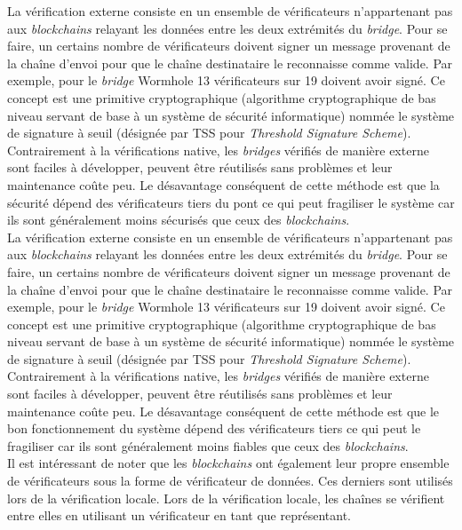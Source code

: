 La vérification externe consiste en un ensemble de \gls{vérificateur}s n’appartenant pas aux \textit{\gls{blockchain}s} relayant les données entre les deux extrémités du \textit{bridge}. Pour se faire, un certains nombre de \gls{vérificateur}s doivent signer un message provenant de la chaîne d’envoi pour que le chaîne destinataire le reconnaisse comme valide. Par exemple, pour le \textit{bridge} \gls{Wormhole} 13 \gls{vérificateur}s sur 19 doivent avoir signé\cite{NomadDocsExternal}. Ce concept est une primitive cryptographique (algorithme cryptographique de bas niveau servant de base à un système de sécurité informatique) nommée le système de signature à seuil (désignée par TSS pour \textit{Threshold Signature Scheme})\cite{BinanceTSS}. 
Contrairement à la vérifications native, les \textit{bridges} vérifiés de manière externe sont faciles à développer, peuvent être réutilisés sans problèmes et leur maintenance coûte peu. Le désavantage conséquent de cette méthode est que la sécurité dépend des \gls{vérificateur}s tiers du pont ce qui peut fragiliser le système car ils sont généralement moins sécurisés que ceux des \textit{\gls{blockchain}s}. \\


La vérification externe consiste en un ensemble de \gls{vérificateur}s n’appartenant pas aux \textit{\gls{blockchain}s} relayant les données entre les deux extrémités du \textit{bridge}. Pour se faire, un certains nombre de \gls{vérificateur}s doivent signer un message provenant de la chaîne d’envoi pour que le chaîne destinataire le reconnaisse comme valide. Par exemple, pour le \textit{bridge} Wormhole 13 \gls{vérificateur}s sur 19 doivent avoir signé\cite{NomadDocsExternal}. Ce concept est une primitive cryptographique (algorithme cryptographique de bas niveau servant de base à un système de sécurité informatique) nommée le système de signature à seuil (désignée par TSS pour \textit{Threshold Signature Scheme})\cite{BinanceTSS}. 
Contrairement à la vérifications native, les \textit{bridges} vérifiés de manière externe sont faciles à développer, peuvent être réutilisés sans problèmes et leur maintenance coûte peu. Le désavantage conséquent de cette méthode est que le bon fonctionnement du système dépend des \gls{vérificateur}s tiers ce qui peut le fragiliser car ils sont généralement moins fiables que ceux des \textit{\gls{blockchain}s}. \\

Il est intéressant de noter que les \textit{\gls{blockchain}s} ont également leur propre ensemble de \gls{vérificateur}s sous la forme de \gls{vérificateur} de données. Ces derniers sont utilisés lors de la vérification locale. Lors de la vérification locale, les chaînes se vérifient entre elles en utilisant un \gls{vérificateur} en tant que représentant.

